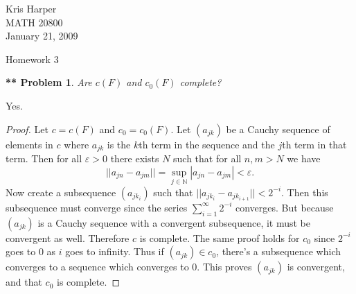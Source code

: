 \documentclass{article}
\newtheorem{**}{** Problem}
\begin{document}
\begin{flushright}
Kris Harper\\

MATH 20800\\

January 21, 2009
\end{flushright}

\begin{center}
Homework 3
\end{center}

\begin{flushleft}

\begin{**}
Are $c(F)$ and $c_0(F)$ complete?
\end{**}

Yes.
\begin{proof}
Let $c = c(F)$ and $c_0 = c_0(F)$. Let $(a_{jk})$ be a Cauchy sequence of elements in $c$ where $a_{jk}$ is the $k$th term in the sequence and the $j$th term in that term. Then for all $\varepsilon > 0$ there exists $N$ such that for all $n,m > N$ we have
\[
||a_{jn} - a_{jm}|| = \sup_{j \in \mathbb{N}} |a_{jn} - a_{jm}| < \varepsilon.
\]
Now create a subsequence $(a_{jk_i})$ such that $||a_{jk_i} - a_{jk_{i+1}}|| < 2^{-i}$. Then this subsequence must converge since the series $\sum_{i = 1}^{\infty} 2^{-i}$ converges. But because $(a_{jk})$ is a Cauchy sequence with a convergent subsequence, it must be convergent as well. Therefore $c$ is complete. The same proof holds for $c_0$ since $2^{-i}$ goes to $0$ as $i$ goes to infinity. Thus if $(a_{jk}) \in c_0$, there's a subsequence which converges to a sequence which converges to $0$. This proves $(a_{jk})$ is convergent, and that $c_0$ is complete.
\end{proof}


\end{flushleft}
\end{document}
